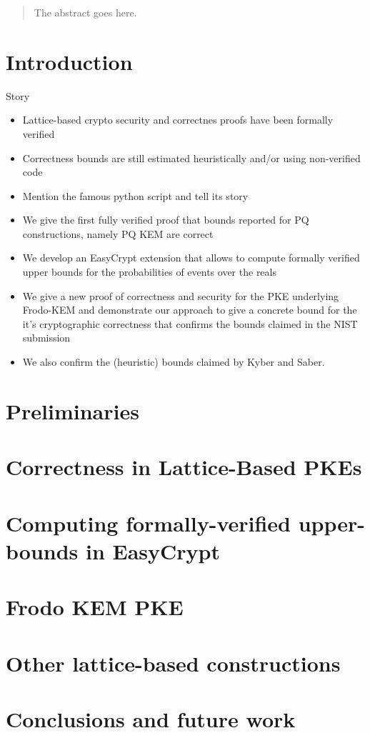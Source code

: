 \documentclass[conference,compsoc]{IEEEtran}
\begin{document}
\begin{abstract}
The abstract goes here.
\end{abstract}

\IEEEpeerreviewmaketitle



\section{Introduction}

Story
\begin{itemize}
\item Lattice-based crypto security and correctnes proofs have been formally verified
\item Correctness bounds are still estimated heuristically and/or using non-verified code
\item Mention the famous python script and tell its story
\item We give the first fully verified proof that bounds reported for PQ constructions, namely PQ KEM are correct
\item We develop an EasyCrypt extension that allows to compute formally verified upper bounds for the probabilities of events over the reals
\item We give a new proof of correctness and security for the PKE underlying Frodo-KEM and demonstrate our approach to give a concrete bound for the it's cryptographic correctness that confirms the bounds claimed in the NIST submission
\item We also confirm the (heuristic) bounds claimed by Kyber and Saber.
\end{itemize}

\section{Preliminaries}

\section{Correctness in Lattice-Based PKEs}

\section{Computing formally-verified upper-bounds in EasyCrypt}

\section{Frodo KEM PKE}

\section{Other lattice-based constructions}

\section{Conclusions and future work}



\end{document}
